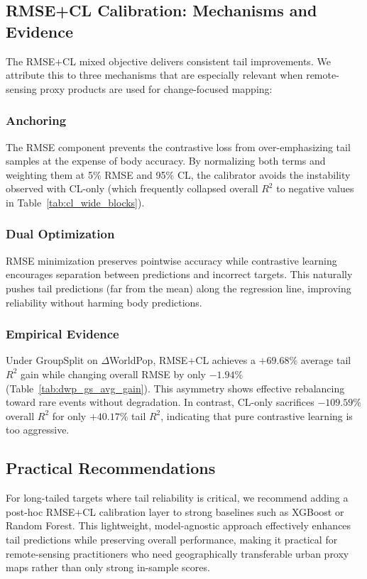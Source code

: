 \documentclass[preprint,12pt]{elsarticle}
\begin{document}
\subsection{RMSE+CL Calibration: Mechanisms and Evidence}

The RMSE+CL mixed objective delivers consistent tail improvements. We attribute this to three mechanisms that are especially relevant when remote-sensing proxy products are used for change-focused mapping:

\subsubsection{Anchoring}
The RMSE component prevents the contrastive loss from over-emphasizing tail samples at the expense of body accuracy. By normalizing both terms and weighting them at 5\% RMSE and 95\% CL, the calibrator avoids the instability observed with CL-only (which frequently collapsed overall $R^2$ to negative values in Table~\ref{tab:cl_wide_blocks}).

\subsubsection{Dual Optimization}
RMSE minimization preserves pointwise accuracy while contrastive learning encourages separation between predictions and incorrect targets. This naturally pushes tail predictions (far from the mean) along the regression line, improving reliability without harming body predictions.

\subsubsection{Empirical Evidence}
Under GroupSplit on $\Delta$WorldPop, RMSE+CL achieves a $+69.68\%$ average tail $R^2$ gain while changing overall RMSE by only $-1.94\%$ (Table~\ref{tab:dwp_gs_avg_gain}). This asymmetry shows effective rebalancing toward rare events without degradation. In contrast, CL-only sacrifices $-109.59\%$ overall $R^2$ for only $+40.17\%$ tail $R^2$, indicating that pure contrastive learning is too aggressive.

\subsection{Practical Recommendations}

For long-tailed targets where tail reliability is critical, we recommend adding a post-hoc RMSE+CL calibration layer to strong baselines such as XGBoost or Random Forest. This lightweight, model-agnostic approach effectively enhances tail predictions while preserving overall performance, making it practical for remote-sensing practitioners who need geographically transferable urban proxy maps rather than only strong in-sample scores.
\end{document}
